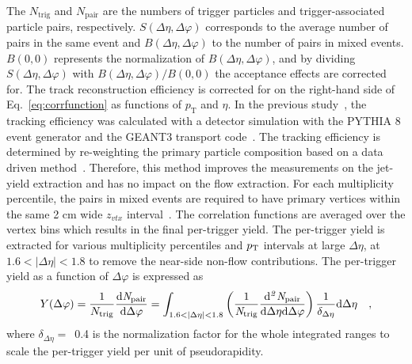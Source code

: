 The $N_\mathrm{trig}$ and $N_\mathrm{pair}$ are the numbers of trigger particles and trigger-associated particle pairs, respectively. $S(\Delta\eta, \Delta\varphi)$ corresponds to the average number of pairs in the same event and $B(\Delta\eta, \Delta\varphi)$ to the number of pairs in mixed events. 
$B (0,0)$ represents the normalization of $B(\Delta\eta, \Delta\varphi)$, and by dividing $S(\Delta\eta, \Delta\varphi)$ with $B(\Delta\eta, \Delta\varphi)/B (0,0)$ the acceptance effects are corrected for. The track reconstruction efficiency is corrected for on the right-hand side of Eq.~\ref{eq:corrfunction} as functions of $p_\mathrm{T}$ and $\eta$. 
In the previous study~\cite{ALICE:2021nir}, the tracking efficiency was calculated with a detector simulation with the PYTHIA 8 event generator and the GEANT3 transport code~\cite{Brun:1994aa}. The tracking efficiency is determined by re-weighting the primary particle composition based on a data driven method~\cite{ALICE:2018hza,ALICE:2018vuu}. Therefore, this method improves the measurements on the jet-yield extraction and has no impact on the flow extraction.
For each multiplicity percentile, the pairs in mixed events are required to have primary vertices within the same 2 cm wide $z_{vtx}$ interval~\cite{KOPYLOV1974472:evtmixing,Adam:2016tsv}. 
The correlation functions are averaged over the vertex bins which results in the final per-trigger yield.
The per-trigger yield is extracted for various multiplicity percentiles and $p_\mathrm{T}$ intervals at large $\Delta\eta$, at $1.6<|\Delta\eta|<1.8$ to remove the near-side non-flow contributions. The per-trigger yield as a function of $\Delta\varphi$ is expressed as
\begin{eqnarray}
Y(\Delta\varphi) = \frac{1}{N_{\rm{trig}}} \frac{ \rm{d}\it{}N_{\rm{pair}} }{ \rm{d}\Delta\varphi } = \int_{1.6<|\Delta \eta|<1.8} \left( \frac{1}{\it{N}_{\rm{trig}}} \frac{ \rm{d}\it{}^{2} N_{\rm{pair}} }{ \rm{d}\Delta\eta \rm{d}\Delta\varphi} \right) \dfrac{1}{\delta_{\Delta\eta}} \rm{d}\Delta \eta \quad ,
\label{eq:pertrigger}
\end{eqnarray}
where $\delta_{\Delta\eta}=$~0.4 is the normalization factor for the whole integrated ranges to scale the per-trigger yield per unit of pseudorapidity. 


